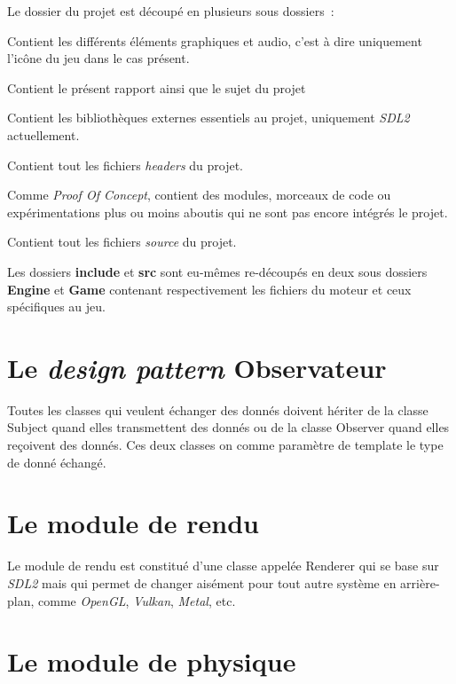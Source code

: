 \documentclass[10pt, french, a4paper]{report}
\newcommand{\class}[1]{{\codefont \NoAutoSpacing \mbox{#1}}}
\begin{document}
Le dossier du projet est découpé en plusieurs sous dossiers~:
\begin{description}[leftmargin=!,labelwidth=\widthof{\bfseries documents}]
	\item [assets] Contient les différents éléments graphiques et audio, c'est à dire 
	               uniquement l'icône du jeu dans le cas présent.
	\item [documents] Contient le présent rapport ainsi que le sujet du projet
	\item [external] Contient les bibliothèques externes essentiels au projet, 
	                 uniquement \textit{SDL2} actuellement.
	\item [include] Contient tout les fichiers \textit{headers} du projet.
	\item [poc] Comme \textit{Proof Of Concept}, contient des modules, morceaux de code 
				ou expérimentations plus ou moins aboutis qui ne sont pas encore intégrés
				le projet.
	\item [src] Contient tout les fichiers \textit{source} du projet.
\end{description}

Les dossiers \textbf{include} et \textbf{src} sont eu-mêmes re-découpés en deux sous dossiers \textbf{Engine} et \textbf{Game} contenant respectivement les fichiers
du moteur et ceux spécifiques au jeu.

\section{Le \textit{design pattern} Observateur}

Toutes les classes qui veulent échanger des donnés doivent hériter de la 
classe \class{Subject} quand elles transmettent des donnés ou de la 
classe \class{Observer} quand elles reçoivent des donnés. Ces deux classes on comme 
paramètre de template le type de donné échangé.

\section{Le module de rendu}

Le module de rendu est constitué d'une classe appelée \class{Renderer} qui 
se base sur \textit{SDL2} mais qui permet de changer aisément pour tout autre 
système en arrière-plan, comme \textit{OpenGL}, \textit{Vulkan}, \textit{Metal}, etc. 


\section{Le module de physique}
\end{document}
